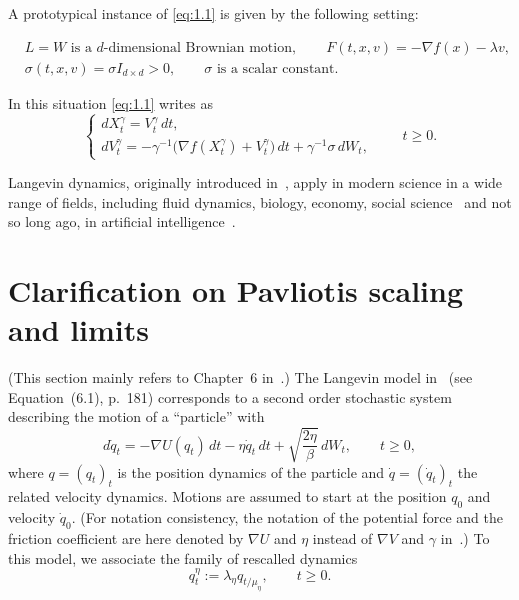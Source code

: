 \documentclass[11pt]{article}
\begin{document}
\begin{remark}
A prototypical instance of \eqref{eq:1.1} is given by the following setting:

\begin{equation}
    \label{eq:1.2}
    \begin{aligned}
    &L = W \text{ is a $d$-dimensional Brownian motion}, \qquad
    F(t,x,v) = -\nabla f(x) - \lambda v, \\
    &\sigma(t,x,v) = \sigma I_{d\times d} > 0, \qquad \sigma \text{ is a scalar constant}.
    \end{aligned}
\end{equation}

In this situation \eqref{eq:1.1} writes as
\begin{equation}
\label{eq:1.3}
\begin{cases}
dX_t^{\gamma} = V_t^{\gamma}\,dt,\\
dV_t^{\gamma} = -\gamma^{-1}\bigl(\nabla f(X_t^{\gamma}) + V_t^{\gamma}\bigr)\,dt + \gamma^{-1}\sigma\,dW_t,
\end{cases}
\qquad t\ge0.
\end{equation}
\end{remark}

Langevin dynamics, originally introduced in~\cite{l08}, apply in modern science in a wide range of fields, including
fluid dynamics, biology, economy, social science~\cite{pt13,naldi10} and not so long ago, in artificial intelligence~\cite{ccb18}.

\section{Clarification on Pavliotis \texorpdfstring{\cite{p14}}{} scaling and limits}

(This section mainly refers to Chapter~6 in~\cite{p14}.) The Langevin model in~\cite{p14} (see Equation~(6.1), p.~181)
corresponds to a second order stochastic system describing the motion of a ``particle'' with
\[
d\dot{q}_t = -\nabla U(q_t)\,dt - \eta\dot{q}_t\,dt + \sqrt{\frac{2\eta}{\beta}}\,dW_t,
\qquad t\ge0,
\]
where $q=(q_t)_t$ is the position dynamics of the particle and $\dot{q}=(\dot{q}_t)_t$ the related velocity dynamics.
Motions are assumed to start at the position $q_0$ and velocity $\dot{q}_0$.
(For notation consistency, the notation of the potential force and the friction coefficient are here denoted by $\nabla U$ and $\eta$
instead of $\nabla V$ and $\gamma$ in~\cite{p14}.) To this model, we associate the family of rescalled dynamics
\[
q_t^{\eta}:=\lambda_{\eta}q_{t/\mu_{\eta}}, \qquad t\ge0.
\]
\end{document}
